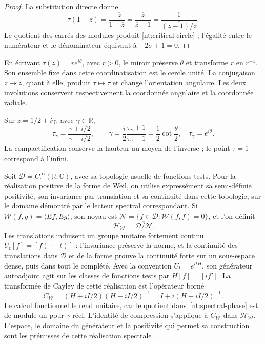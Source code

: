\begin{proof}
La substitution directe donne
\[
 \tau(1-\overline z)
 =\frac{-\overline z}{1-\overline z}
 =\frac{\overline z}{\overline z-1}
 =\frac1{\overline{(z-1)/z}}.
\]
Le quotient des carrés des modules produit
\eqref{nt:critical-circle} ; l’égalité entre le numérateur et le
dénominateur équivaut à \(-2\sigma+1=0\).
\end{proof}

En écrivant \(\tau(z)=r e^{i\theta}\), avec \(r>0\), le miroir préserve \(\theta\) et transforme \(r\) en \(r^{-1}\). Son ensemble fixe dans cette coordinatisation est le cercle unité. La conjugaison \(z\mapsto\overline z\), quant à elle, produit \(\tau\mapsto\overline\tau\) et change l'orientation angulaire. Les deux involutions conservent respectivement la coordonnée angulaire et la coordonnée radiale.

Sur \(z=1/2+i\gamma\), avec \(\gamma\in\mathbb R\),
\begin{equation}
 \tau_\gamma=\frac{\gamma+i/2}{\gamma-i/2},
 \qquad
 \gamma=\frac{i}{2}\frac{\tau_\gamma+1}{\tau_\gamma-1}
       =\frac12\cot\frac{\theta}{2},
 \quad \tau_\gamma=e^{i\theta}.
 \label{nt:spectral-phase}
\end{equation}
La compactification conserve la hauteur au moyen de l'inverse ; le point \(\tau=1\) correspond à l'infini.

Soit \(\mathcal D=C_c^\infty(\mathbb R;\mathbb C)\), avec sa topologie
usuelle de fonctions tests. Pour la réalisation positive de la forme
de Weil, on utilise expressément sa semi-définie positivité, son
invariance par translation et sa continuité dans cette topologie, sur le
domaine démontré par le lecteur spectral correspondant. Si
\(\mathscr W(f,g)=\langle Ef,Eg\rangle\), son noyau est
\(\mathcal N=\{f\in\mathcal D:\mathscr W(f,f)=0\}\), et l’on définit
\[
 \mathcal H_{\mathscr W}
 =\overline{\mathcal D/\mathcal N}.
\]
Les translations induisent un groupe unitaire fortement continu \(U_t[f]=[f(\,\cdot-t)]\) : l'invariance préserve la norme, et la continuité des translations dans \(\mathcal D\) et de la forme prouve la continuité forte sur un sous-espace dense, puis dans tout le complété. Avec la convention \(U_t=e^{itH}\), son générateur autoadjoint agit sur les classes de fonctions tests par \(H[f]=[if']\). La transformée de Cayley de cette réalisation est l'opérateur borné
\begin{equation}
 C_{\mathscr W}
 =(H+iI/2)(H-iI/2)^{-1}
 =I+i(H-iI/2)^{-1}.
 \label{nt:cayley-hilbert}
\end{equation}
Le calcul fonctionnel le rend unitaire, car le quotient
dans~\eqref{nt:spectral-phase} est de module un pour
\(\gamma\) réel. L’identité de compression s’applique
à \(C_{\mathscr W}\) dans \(\mathcal H_{\mathscr W}\).
L’espace, le domaine du générateur et la positivité
qui permet sa construction sont les prémisses de cette
réalisation spectrale \cite{HMT-VIII}.

